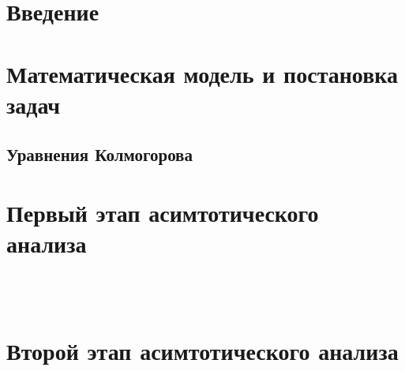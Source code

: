 \documentclass[a4paper,12pt]{article}
\begin{document}
	
	\newpage

	\tableofcontents
	\newpage
	

\section{Введение}

	
	\newpage
	

\section{Математическая модель и постановка задач}

	
	\newpage
	
	\begin{center}
		\section{Уравнения Колмогорова}
	\end{center}
	
	
	\newpage
	
	\newpage
	
\section{Первый этап асимтотического анализа}
	\\
	
	\\
	
	\newpage
	
\section{Второй этап асимтотического анализа}
	
	
	
\end{document}
